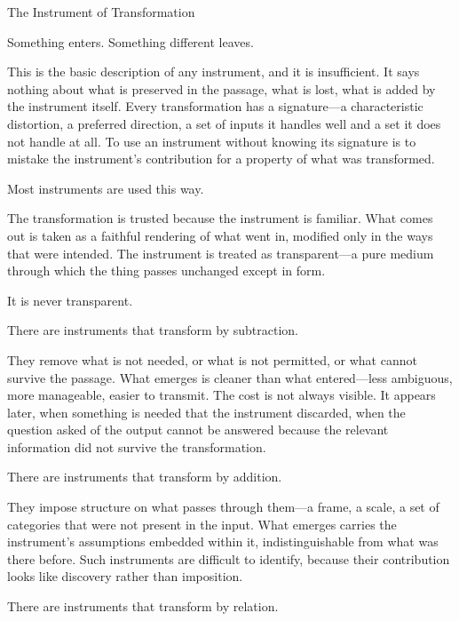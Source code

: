 
\begin{interlude}{The Instrument of Transformation}

Something enters. Something different leaves.

This is the basic description of any instrument, and it is
insufficient. It says nothing about what is preserved in the
passage, what is lost, what is added by the instrument itself.
Every transformation has a signature---a characteristic distortion,
a preferred direction, a set of inputs it handles well and a set
it does not handle at all. To use an instrument without knowing
its signature is to mistake the instrument's contribution for a
property of what was transformed.

Most instruments are used this way.

The transformation is trusted because the instrument is familiar.
What comes out is taken as a faithful rendering of what went in,
modified only in the ways that were intended. The instrument is
treated as transparent---a pure medium through which the thing
passes unchanged except in form.

It is never transparent.

\medskip

There are instruments that transform by subtraction.

They remove what is not needed, or what is not permitted, or what
cannot survive the passage. What emerges is cleaner than what
entered---less ambiguous, more manageable, easier to transmit. The
cost is not always visible. It appears later, when something is
needed that the instrument discarded, when the question asked of
the output cannot be answered because the relevant information did
not survive the transformation.

There are instruments that transform by addition.

They impose structure on what passes through them---a frame, a
scale, a set of categories that were not present in the input.
What emerges carries the instrument's assumptions embedded within
it, indistinguishable from what was there before. Such instruments
are difficult to identify, because their contribution looks like
discovery rather than imposition.

There are instruments that transform by relation.


\end{interlude}
